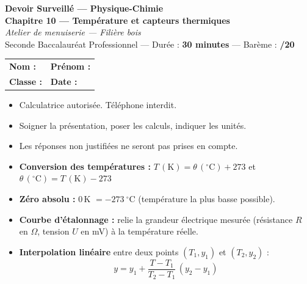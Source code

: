 \documentclass[a4paper,11pt]{article}
\begin{document}
\begin{center}
{\LARGE\bfseries\color{violet} Devoir Surveillé — Physique-Chimie}\\[4pt]
{\large\bfseries Chapitre 10 — Température et capteurs thermiques}\\[4pt]
{\normalsize\itshape Atelier de menuiserie — Filière bois}\\[6pt]
{\normalsize Seconde Baccalauréat Professionnel — Durée : \textbf{30 minutes} — Barème : \textbf{/20}}
\end{center}

\vspace{2pt}
\noindent
\begin{tabular}{@{}p{}p{}@{}}
\textbf{Nom :} \dotfill & \textbf{Prénom :} \dotfill \\[6pt]
\textbf{Classe :} \dotfill & \textbf{Date :} \dotfill \\
\end{tabular}

\vspace{4pt}
\begin{consigne}
\begin{itemize}[leftmargin=*,itemsep=1pt,topsep=2pt]
  \item Calculatrice autorisée. Téléphone interdit.
  \item Soigner la présentation, poser les calculs, indiquer les unités.
  \item Les réponses non justifiées ne seront pas prises en compte.
\end{itemize}
\end{consigne}

\begin{rappel}
\begin{itemize}[leftmargin=*,itemsep=1pt,topsep=2pt]
  \item \textbf{Conversion des températures :} $T\,(\text{K}) = \theta\,(^\circ\text{C}) + 273$
        \quad et \quad $\theta\,(^\circ\text{C}) = T\,(\text{K}) - 273$
  \item \textbf{Zéro absolu :} $0$\,K $= -273\ ^\circ$C (température la plus basse possible).
  \item \textbf{Courbe d'étalonnage :} relie la grandeur électrique mesurée (résistance $R$ en $\Omega$, tension $U$ en mV) à la température réelle.
  \item \textbf{Interpolation linéaire} entre deux points $(T_1,y_1)$ et $(T_2,y_2)$ :
        \[ y = y_1 + \frac{T - T_1}{T_2 - T_1}\,(y_2 - y_1) \]
\end{itemize}
\end{rappel}
\end{document}
